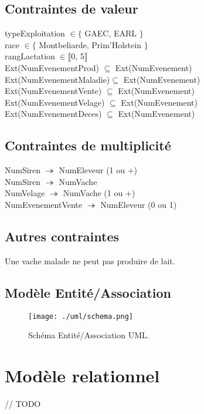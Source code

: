 \documentclass[12pt]{report}
\begin{document}
\subsection{Contraintes de valeur}
\noindent
typeExploitation $\in \lbrace$ GAEC, EARL $\rbrace$ \\
race $\in \lbrace$ Montbeliarde, Prim'Holstein $\rbrace$ \\
rangLactation $\in \llbracket$0, 5$\rrbracket$ \\
Ext(NumEvenementProd) $\subseteq$ Ext(NumEvenement) \\
Ext(NumEvenementMaladie)$\subseteq$ Ext(NumEvenement) \\
Ext(NumEvenementVente) $\subseteq$ Ext(NumEvenement) \\
Ext(NumEvenementVelage) $\subseteq$ Ext(NumEvenement) \\
Ext(NumEvenementDeces) $\subseteq$ Ext(NumEvenement) 

\subsection{Contraintes de multiplicité}
\noindent
NumSiren {\Large$\twoheadrightarrow$} NumEleveur (1 ou +) \\
NumSiren {\Large$\twoheadrightarrow$} NumVache \\
NumVelage {\Large$\twoheadrightarrow$} NumVache (1 ou +) \\
NumEvenementVente {\Large$\twoheadrightarrow$} NumEleveur (0 ou 1) \\

\subsection{Autres contraintes}
Une vache malade ne peut pas produire de lait. \\

\begin{landscape}

\section{Modèle Entité/Association}

\begin{figure}[!h]
\centering
\texttt{[image: ./uml/schema.png]}
\caption{Schéma Entité/Association UML.}
\end{figure}

\end{landscape}

\section{Modèle relationnel}
// TODO
\end{document}
